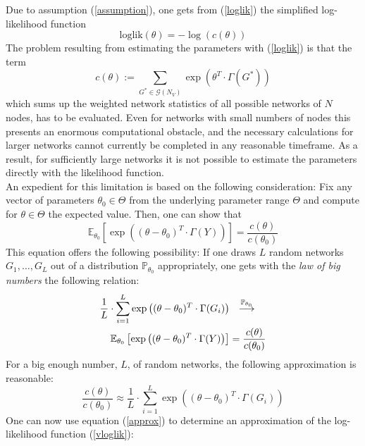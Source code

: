 \documentclass[10pt, conference, compsocconf]{IEEEtran}
\begin{document}
Due to assumption (\ref{assumption}), one gets from (\ref{loglik}) the simplified log-likelihood function
%
\begin{equation}
\text{loglik}(\theta)= -\log(c(\theta))
\label{vloglik}
\end{equation}
%
The problem resulting from estimating the parameters with (\ref{loglik}) is that the term
%
$$c(\theta):= \sum_{G^* \in \mathcal{G}(N_V)} \exp(\theta^T \cdot \Gamma(G^*))$$ 
%
which sums up the weighted network statistics of all possible networks of $N$ nodes, has to be evaluated. Even for networks with small numbers of nodes this presents an enormous computational obstacle, and the necessary calculations for larger networks cannot currently be completed in any reasonable timeframe.
As a result, for sufficiently large networks it is not possible to estimate the parameters directly with the likelihood function.
\\[0.3cm]
An expedient for this limitation is based on the following consideration: Fix any vector of parameters $\theta_0 \in \Theta$ from the underlying parameter range $\Theta$ and compute for $\theta \in \Theta$ the expected value. Then, one can show that
%
\begin{equation*}
\mathbb{E}_{\theta_0}\left[ \exp\left((\theta - \theta_0)^T \cdot \Gamma(Y)\right) \right]=\frac{c(\theta)}{c(\theta_0)}
\end{equation*}
%
This equation offers the following possibility: If one draws $L$ random networks $G_1, \dots ,G_L$ out of a distribution $\mathbb{P}_{\theta_0}$ appropriately, one gets with the \textit{law of big numbers} the following relation:
%
\begin{equation}\label{konver}
\begin{split}
\frac{1}{L}\cdot \sum_{i=1}^{L}  \exp\left((\theta - \theta_0)^T \cdot \Gamma(G_i)\right) &
~~\stackrel {{\tiny\mathbb{P}_{\theta_0}}}{\longrightarrow}~~\\ \mathbb{E}_{\theta_0}\left[ \exp\left((\theta - \theta_0)^T \cdot \Gamma(Y)\right) \right]& = \frac{c(\theta)}{c(\theta_0)}
\end{split}
\end{equation}
%
For a big enough number, $L$, of random networks, the following approximation is reasonable:
%
\begin{equation}
\frac{c(\theta)}{c(\theta_0)} \approx \frac{1}{L}\cdot \sum_{i=1}^{L}  \exp\left((\theta - \theta_0)^T \cdot \Gamma(G_i)\right)
\label{approx}
\end{equation}
%
One can now use equation (\ref{approx}) to determine an approximation of the log-likelihood function (\ref{vloglik}):
\end{document}
